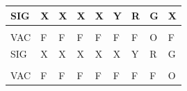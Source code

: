 \documentclass[a4paper,12pt]{article}
\begin{document}
\begin{table}[htp]
\begin{tabular}{lllllllll}
\multicolumn{1}{|l|}{SIG}   & \multicolumn{1}{l|}{X}                         & \multicolumn{1}{l|}{X}                         & \multicolumn{1}{l|}{X}                         & \multicolumn{1}{l|}{X}                         & \multicolumn{1}{l|}{\cellcolor[HTML]{F8FF00}Y} & \multicolumn{1}{l|}{\cellcolor[HTML]{FE0000}R} & \multicolumn{1}{l|}{\cellcolor[HTML]{009901}G}                        & \multicolumn{1}{l|}{X}                                                \\ \hline
                            &                                                &                                                &                                                &                                                &                                                &                                                &                                                                       &                                                                       \\ \hline
\multicolumn{1}{|l|}{VAC}   & \multicolumn{1}{l|}{\cellcolor[HTML]{32CB00}F} & \multicolumn{1}{l|}{\cellcolor[HTML]{32CB00}F} & \multicolumn{1}{l|}{\cellcolor[HTML]{32CB00}F} & \multicolumn{1}{l|}{\cellcolor[HTML]{32CB00}F} & \multicolumn{1}{l|}{\cellcolor[HTML]{32CB00}F} & \multicolumn{1}{l|}{\cellcolor[HTML]{32CB00}F} & \multicolumn{1}{l|}{\cellcolor[HTML]{FD6864}O}                        & \multicolumn{1}{l|}{\cellcolor[HTML]{32CB00}F}                        \\ \hline
\multicolumn{1}{|l|}{SIG}   & \multicolumn{1}{l|}{X}                         & \multicolumn{1}{l|}{X}                         & \multicolumn{1}{l|}{X}                         & \multicolumn{1}{l|}{X}                         & \multicolumn{1}{l|}{X}                         & \multicolumn{1}{l|}{\cellcolor[HTML]{F8FF00}Y} & \multicolumn{1}{l|}{\cellcolor[HTML]{FE0000}R}                        & \multicolumn{1}{l|}{\cellcolor[HTML]{009901}G}                        \\ \hline
                            &                                                &                                                &                                                &                                                &                                                &                                                &                                                                       &                                                                       \\ \hline
\multicolumn{1}{|l|}{VAC}   & \multicolumn{1}{l|}{\cellcolor[HTML]{32CB00}F} & \multicolumn{1}{l|}{\cellcolor[HTML]{32CB00}F} & \multicolumn{1}{l|}{\cellcolor[HTML]{32CB00}F} & \multicolumn{1}{l|}{\cellcolor[HTML]{32CB00}F} & \multicolumn{1}{l|}{\cellcolor[HTML]{32CB00}F} & \multicolumn{1}{l|}{\cellcolor[HTML]{32CB00}F} & \multicolumn{1}{l|}{\cellcolor[HTML]{32CB00}F}                        & \multicolumn{1}{l|}{\cellcolor[HTML]{FD6864}O}                        \\ \hline

\end{tabular}
\end{table}
\end{document}
